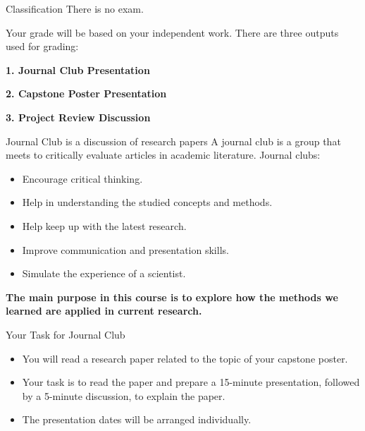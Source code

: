 \begin{frame}{Classification}
    \centering
    \Large
    There is no exam.
    
    \vspace{1em}
    Your grade will be based on your independent work. There are three outputs used for grading:

    \vspace{1em}
    \color{primary}
    \Large \textbf{1. Journal Club Presentation} 
    
    \vspace{1em}
    \textbf{2. Capstone Poster Presentation} 

    \vspace{1em}
    \textbf{3. Project Review Discussion} 
\end{frame}

\begin{frame}{Journal Club is a discussion of research papers}
   A journal club is a group that meets to critically evaluate articles in academic literature. Journal clubs:
     \begin{itemize}
        \item Encourage critical thinking.
        \item Help in understanding the studied concepts and methods.
        \item Help keep up with the latest research.
        \item Improve communication and presentation skills.
        \item Simulate the experience of a scientist.
    \end{itemize}
    \vspace{1em}
    \textbf{The main purpose in this course is to explore how the methods we learned are applied in current research.}
\end{frame}

\begin{frame}{Your Task for Journal Club}
    \begin{itemize}
        \item You will read a research paper related to the topic of your capstone poster.
        \item Your task is to read the paper and prepare a 15-minute presentation, followed by a 5-minute discussion, to explain the paper.
        \item The presentation dates will be arranged individually. 
    \end{itemize}
\end{frame}

